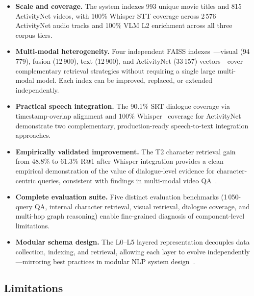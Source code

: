 \documentclass[11pt]{article}
\begin{document}
\begin{itemize}[leftmargin=1.4em]
  \item \textbf{Scale and coverage.}  The system indexes 993 unique movie
        titles and 815 ActivityNet videos, with 100\% Whisper STT coverage
        across 2\,576 ActivityNet audio tracks and 100\% VLM L2 enrichment
        across all three corpus tiers.

  \item \textbf{Multi-modal heterogeneity.}  Four independent FAISS
        indexes~\cite{faiss}---visual (94\,779), fusion (12\,900), text
        (12\,900), and ActivityNet (33\,157) vectors---cover complementary
        retrieval strategies without requiring a single large multi-modal
        model.  Each index can be improved, replaced, or extended
        independently.

  \item \textbf{Practical speech integration.}  The 90.1\% SRT dialogue
        coverage via timestamp-overlap alignment and 100\% Whisper~\cite{whisper}
        coverage for ActivityNet demonstrate two complementary,
        production-ready speech-to-text integration approaches.

  \item \textbf{Empirically validated improvement.}  The T2 character
        retrieval gain from 48.8\% to 61.3\% R@1 after Whisper integration
        provides a clean empirical demonstration of the value of
        dialogue-level evidence for character-centric queries, consistent with
        findings in multi-modal video QA~\cite{videorag,internvideo2}.

  \item \textbf{Complete evaluation suite.}  Five distinct evaluation
        benchmarks (1\,050-query QA, internal character retrieval, visual
        retrieval, dialogue coverage, and multi-hop graph reasoning) enable
        fine-grained diagnosis of component-level limitations.

  \item \textbf{Modular schema design.}  The L0--L5 layered representation
        decouples data collection, indexing, and retrieval, allowing each
        layer to evolve independently---mirroring best practices in modular
        NLP system design~\cite{rag,selfrag}.
\end{itemize}

\subsection{Limitations}
\end{document}
